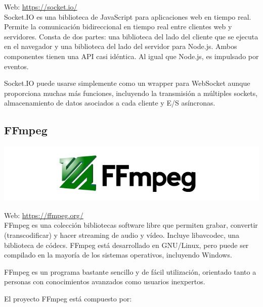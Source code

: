 Web: \url{https://socket.io/}\\

Socket.IO es una biblioteca de JavaScript para aplicaciones web en tiempo real. Permite la comunicación bidireccional en tiempo real entre clientes web y servidores. Consta de dos partes: una biblioteca del lado del cliente
que se ejecuta en el navegador y una biblioteca del lado del servidor para Node.js. Ambos componentes tienen una API casi idéntica. Al igual que Node.js, es impulsado por eventos.

Socket.IO puede usarse simplemente como un wrapper para WebSocket aunque proporciona muchas más funciones, incluyendo la transmisión a múltiples sockets, almacenamiento de datos asociados a cada cliente y E/S asíncronas.


\subsection{ FFmpeg }


\begin{center}
\includegraphics[scale=0.75]{imagenes/Ffmpeg-logo.jpg}
\end{center}

Web: \url{https://ffmpeg.org/}\\

FFmpeg es una colección bibliotecas software libre que permiten grabar, convertir (transcodificar) y hacer streaming de audio y vídeo. Incluye libavcodec, una biblioteca de códecs. FFmpeg está desarrollado en GNU/Linux, pero puede ser compilado
en la mayoría de los sistemas operativos, incluyendo Windows.

FFmpeg es un programa bastante sencillo y de fácil utilización, orientado tanto a personas con conocimientos avanzados como usuarios inexpertos. 

El proyecto FFmpeg está compuesto por:

